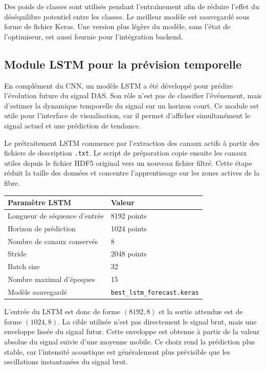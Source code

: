 \documentclass[10pt,a4paper]{article}
\begin{document}
Des poids de classes sont utilisés pendant l'entraînement afin de réduire l'effet du déséquilibre potentiel
entre les classes. Le meilleur modèle est sauvegardé sous forme de fichier Keras. Une version plus légère
du modèle, sans l'état de l'optimiseur, est aussi fournie pour l'intégration backend.

\subsection{Module LSTM pour la prévision temporelle}

En complément du CNN, un modèle LSTM a été développé pour prédire l'évolution future du signal DAS. Son rôle
n'est pas de classifier l'événement, mais d'estimer la dynamique temporelle du signal sur un horizon court.
Ce module est utile pour l'interface de visualisation, car il permet d'afficher simultanément le signal actuel
et une prédiction de tendance.

Le prétraitement LSTM commence par l'extraction des canaux actifs à partir des fichiers de description
\texttt{.txt}. Le script de préparation copie ensuite les canaux utiles depuis le fichier HDF5 original vers
un nouveau fichier filtré. Cette étape réduit la taille des données et concentre l'apprentissage sur les zones
actives de la fibre.

\begin{center}
\begin{tabular}{ll}
\toprule
\textbf{Paramètre LSTM} & \textbf{Valeur} \\
\midrule
Longueur de séquence d'entrée & 8192 points \\
Horizon de prédiction & 1024 points \\
Nombre de canaux conservés & 8 \\
Stride & 2048 points \\
Batch size & 32 \\
Nombre maximal d'époques & 15 \\
Modèle sauvegardé & \texttt{best\_lstm\_forecast.keras} \\
\bottomrule
\end{tabular}
\end{center}

L'entrée du LSTM est donc de forme $(8192, 8)$ et la sortie attendue est de forme $(1024, 8)$. La cible
utilisée n'est pas directement le signal brut, mais une enveloppe lissée du signal futur. Cette enveloppe
est obtenue à partir de la valeur absolue du signal suivie d'une moyenne mobile. Ce choix rend la prédiction
plus stable, car l'intensité acoustique est généralement plus prévisible que les oscillations instantanées
du signal brut.
\end{document}
